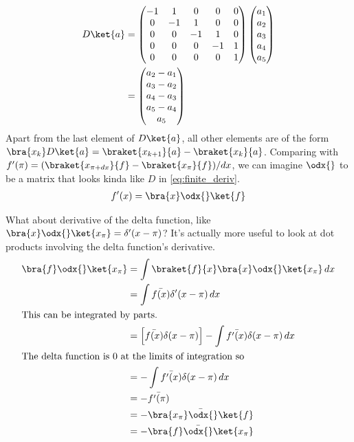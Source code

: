 \documentclass[12pt, oneside, letterpaper, fleqn]{article}
\begin{document}
\begin{align}\begin{split}\label{eq:finite_deriv}
D \ket{a} &=
\begin{pmatrix}
-1 & 1 & 0 & 0 & 0\\
0 & -1 & 1 & 0 & 0\\
0 & 0 & -1 & 1 & 0\\
0 & 0 & 0 & -1 & 1\\
0 & 0 & 0 & 0 & 1\\
\end{pmatrix}
\begin{pmatrix}
a_1\\
a_2\\
a_3\\
a_4\\
a_5
\end{pmatrix}\\
&=
\begin{pmatrix}
a_2 - a_1\\
a_3 - a_2\\
a_4 - a_3\\
a_5 - a_4\\
a_5
\end{pmatrix}
\end{split}\end{align}
Apart from the last element of $D\ket{a}$, all other elements are of
the form $\bra{x_k}D\ket{a} = \braket{x_{k+1}}{a} - \braket{x_k}{a}$.
Comparing with $f'(\pi) = (\braket{x_{\pi+dx}}{f} -
\braket{x_\pi}{f})/dx$, we can imagine $\odx{}$ to be a matrix
that looks kinda like $D$ in \eqref{eq:finite_deriv}.
\begin{align}
f'(x) = \bra{x}\odx{}\ket{f}
\end{align}

What about derivative of the delta function, like
$\bra{x}\odx{}\ket{x_\pi} = \delta'(x - \pi)$? It's actually more useful
to look at dot products involving the delta function's derivative.
\begin{align*}
\bra{f}\odx{}\ket{x_\pi} &= \int
\braket{f}{x}\bra{x}\odx{}\ket{x_\pi}\,dx\\
&= \int \bar{f(x)} \delta'(x-\pi)\,dx\\
\intertext{This can be integrated by parts.}
&= \left[\bar{f(x)} \delta(x-\pi)\right] - \int \bar{f'(x)}
\delta(x-\pi)\,dx\\
\intertext{The delta function is $0$ at the limits of integration so}
&= -\int \bar{f'(x)}\delta(x-\pi)\,dx\\
&= -\bar{f'(\pi)}\\
&= -\bar{\bra{x_\pi}\odx{}\ket{f}}\\
&= -\bra{f}\bar{\odx{}}\ket{x_\pi}
\end{align*}
\end{document}

